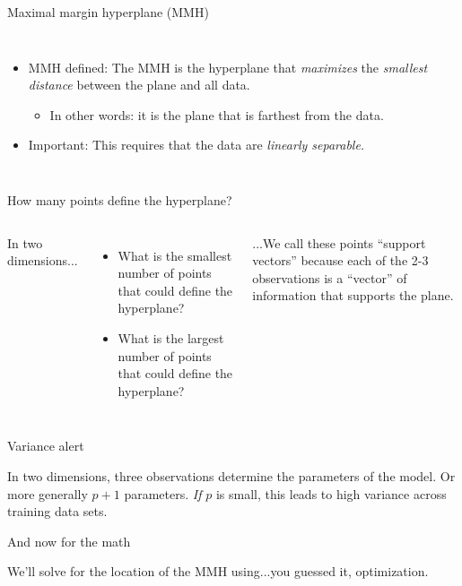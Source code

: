 \documentclass[mathserif, aspectratio=169]{beamer}
\begin{document}
\begin{frame}{Maximal margin hyperplane (MMH)}

\begin{columns}
\begin{itemize}
\item MMH defined: The MMH is the hyperplane that \textit{maximizes} the \textit{smallest distance} between the plane and all data.
\begin{itemize}
\item In other words: it is the plane that is farthest from the data.
\end{itemize}
\item Important: This requires that the data are \textit{linearly separable.  }
\end{itemize}

\end{columns}
\end{frame}

\begin{frame}{How many points define the hyperplane?}

\begin{columns}
In two dimensions...
\begin{itemize}
\item What is the smallest number of points that could define the hyperplane?
\vspace{5mm}
\item What is the largest number of points that could define the hyperplane?
\vspace{5mm}
\end{itemize}
...We call these points ``support vectors'' because each of the 2-3 observations is a ``vector'' of information that supports the plane.

\end{columns}

\end{frame}

\begin{frame}{Variance alert}

In two dimensions, three observations determine the parameters of the model.  Or more generally $p+1$ parameters.  \textit{If} $p$ is small, this leads to high variance across training data sets.   
\end{frame}

\begin{frame}{And now for the math}

We'll solve for the location of the MMH using...\pause you guessed it, optimization.  

\vspace{40mm}

\end{frame}
\end{document}
